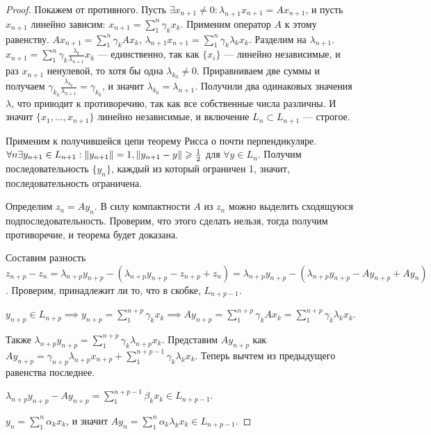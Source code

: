 \documentclass{article}
\begin{document}
\begin{proof}
    Покажем от противного. Пусть $\exists x_{n+1} \neq 0: \lambda_{n+1}x_{n+1} = Ax_{n+1}$, и пусть $x_{n+1}$ линейно зависим: $x_{n+1} = \sum_{1}^{n}\gamma_k x_k$. Применим оператор $A$ к этому равенству. $Ax_{n+1} = \sum_{1}^{n}\gamma_k Ax_k$, $\lambda_{n+1} x_{n+1} = \sum_{1}^{n}\gamma_k \lambda_k x_k$. Разделим на $\lambda_{n+1}$. $x_{n+1} = \sum_{1}^{n}\gamma_k \frac{\lambda_k}{\lambda_{n+1}} x_k$ --- единственно, так как $\{x_{i}\}$ --- линейно независимые, и раз $x_{n+1}$ ненулевой, то хотя бы одна $\lambda_{k_{0}} \neq 0$. Приравниваем две суммы и получаем $\gamma_{k_{0}} \frac{\lambda_{k_{0}}}{\lambda_{n+1}} = \gamma_{k_{0}}$, и значит $\lambda_{k_{0}} = \lambda_{n+1}$. Получили два одинаковых значения $\lambda$, что приводит к противоречию, так как все собственные числа различны. И значит $\{x_{1}, \dotso, x_{n+1}\}$ линейно независимые, и включение $L_{n} \subset L_{n+1}$ --- строгое. \hfill \break

    Применим к получившейся цепи теорему Рисса о почти перпендикуляре. $\forall n \exists y_{n+1} \in L_{n+1}: \left\|y_{n+1}\right\| = 1, \left\|y_{n+1} - y\right\| \geqslant \frac{1}{2}$ для $\forall y \in L_n$. Получим последовательность $\{y_{n}\}$, каждый из который ограничен 1, значит, последовательность ограничена.
    
    Определим $z_{n} = Ay_n$. В силу компактности $A$ из $z_n$ можно выделить сходящуюся подпоследовательность. Проверим, что этого сделать нельзя, тогда получим противоречие, и теорема будет доказана.
    
    Составим разность $z_{n+p} - z_{n} = \lambda_{n+p}y_{n+p} - (\lambda_{n+p}y_{n+p} - z_{n+p} + z_{n}) = \lambda_{n+p}y_{n+p} - (\lambda_{n+p}y_{n+p} - Ay_{n+p} + Ay_{n})$. Проверим, принадлежит ли то, что в скобке, $L_{n+p-1}$. 
    
    $y_{n+p} \in L_{n+p} \implies y_{n+p} = \sum_{1}^{n+p}\gamma_k x_k \implies Ay_{n+p} = \sum_{1}^{n+p}\gamma_k Ax_k = \sum_{1}^{n+p}\gamma_k \lambda_k x_k$. 
    
    Также $\lambda_{n+p} y_{n+p} = \sum_{1}^{n+p}\gamma_k \lambda_{n+p}x_k$. Представим $Ay_{n+p}$ как $Ay_{n+p} = \gamma_{n+p}\lambda_{n+p}x_{n+p} + \sum_{1}^{n+p-1}\gamma_k \lambda_k x_k$. Теперь вычтем из предыдущего равенства последнее.
    
    $\lambda_{n+p} y_{n+p} - Ay_{n+p} = \sum_{1}^{n+p-1} \beta_k x_k \in L_{n+p-1}$.
    
    $y_{n} = \sum_{1}^{n} \alpha_k x_k$, и значит $Ay_{n} = \sum_{1}^{n} \alpha_k \lambda_k x_k \in L_{n+p-1}$.
    

\end{proof}
\end{document}
